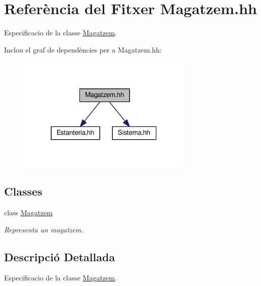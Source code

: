 \hypertarget{_magatzem_8hh}{}\section{Referència del Fitxer Magatzem.\+hh}
\label{_magatzem_8hh}


Especificacio de la classe \hyperlink{class_magatzem}{Magatzem}.  


Inclou el graf de dependències per a Magatzem.\+hh\+:
\nopagebreak
\begin{figure}[H]
\begin{center}
\leavevmode
\includegraphics[width=236pt]{_magatzem_8hh__incl}
\end{center}
\end{figure}
\subsection*{Classes}
\begin{DoxyCompactItemize}
\item 
class \hyperlink{class_magatzem}{Magatzem}
\begin{DoxyCompactList}\small\item\em Representa un magatzem. \end{DoxyCompactList}\end{DoxyCompactItemize}


\subsection{Descripció Detallada}
Especificacio de la classe \hyperlink{class_magatzem}{Magatzem}. 

